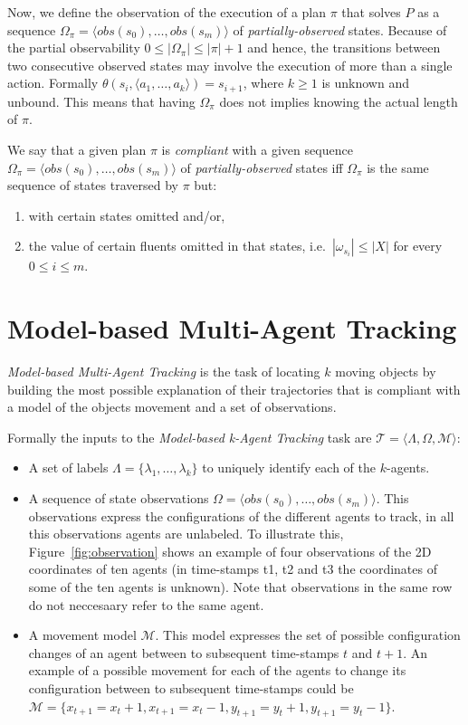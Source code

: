 \documentclass[letterpaper]{article} %
\newcommand{\tup}[1]{{\langle #1 \rangle}}
\begin{document}
Now, we define the observation of the execution of a plan $\pi$ that solves $P$ as a sequence $\Omega_\pi=\tup{obs(s_0), \ldots, obs(s_m)}$ of {\em partially-observed} states. Because of the partial observability $0\leq |\Omega_\pi|\leq |\pi|+1$ and hence, the transitions between two consecutive observed states may involve the execution of more than a single action. Formally $\theta(s_i,\tup{a_1,\ldots,a_k})=s_{i+1}$, where $k\geq 1$ is unknown and unbound. This means that having $\Omega_\pi$ does not implies knowing the actual length of $\pi$.

We say that a given plan $\pi$ is {\em compliant} with a given sequence $\Omega_\pi=\tup{obs(s_0), \ldots, obs(s_m)}$ of {\em partially-observed} states iff $\Omega_\pi$ is the same sequence of states traversed by $\pi$ but:
\begin{enumerate}
\item with certain states omitted and/or,
\item the value of certain fluents omitted in that states, i.e.~$|\omega_{s_i}|\leq |X|$ for every $0\leq i\leq m$.
\end{enumerate}

\section{Model-based Multi-Agent Tracking}
\label{sec:tracking}

{\em Model-based Multi-Agent Tracking} is the task of locating $k$ moving objects by building the most possible explanation of their trajectories that is compliant with a model of the objects movement and a set of observations.

Formally the inputs to the {\em Model-based k-Agent Tracking} task are $\mathcal{T}=\tup{\Lambda, \Omega, \mathcal{M}}$:
\begin{itemize}
\item A set of labels $\Lambda=\{\lambda_1,\ldots,\lambda_k\}$ to uniquely identify each of the $k$-agents.
\item A sequence of state observations $\Omega=\tup{obs(s_0), \ldots, obs(s_m)}$. This observations express the configurations of the different agents to track, in all this observations agents are unlabeled. To illustrate this, Figure~\ref{fig:observation} shows an example of four observations of the 2D coordinates of ten agents (in time-stamps t1, t2 and t3 the coordinates of some of the ten agents is unknown). Note that observations in the same row do not neccesaary refer to the same agent. 
\item A movement model $\mathcal{M}$. This model expresses the set of possible configuration changes of an agent between to subsequent time-stamps $t$ and $t+1$. An example of a possible movement for each of the agents to change its configuration between to subsequent time-stamps could be $\mathcal{M}=\{x_{t+1}=x_t + 1, x_{t+1}=x_t - 1, y_{t+1}=y_t + 1, y_{t+1}=y_t - 1\}$.
\end{itemize}
\end{document}
